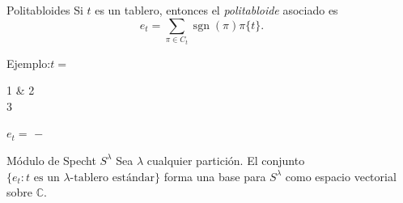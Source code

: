 \documentclass[final,xcolor=svgnames]{beamer}
\DeclareMathOperator{\sgn}{sgn}
\begin{document}
\begin{frame}{}
\begin{columns}
\begin{column}{0.5\textwidth}
      \begin{block}{Politabloides}
        Si $t$ es un tablero, entonces el \textit{politabloide} asociado es
        $$e_{t}=\sum_{\pi\in C_{t}}\sgn(\pi)\pi\{t\}.$$
        \begin{center} Ejemplo:\quad $t=$
          \begin{ytableau}
            1 & 2 \\
            3
          \end{ytableau}\quad
          $e_{t}=$
          $-$ 
        \end{center}
      \end{block}

      \begin{block}{Módulo de Specht $S^{\lambda}$}
        Sea $\lambda$ cualquier partición. El conjunto $\{e_{t}:t
        \mbox{ es un }\lambda\mbox{-tablero estándar}\}$
        forma una base para $S^{\lambda}$ como espacio vectorial
        sobre $\mathbb{C}$.
      \end{block}     
    \end{column}

    \begin{column}{0.5\textwidth}
      
        

\end{column}
\end{columns}
\end{frame}
\end{document}
